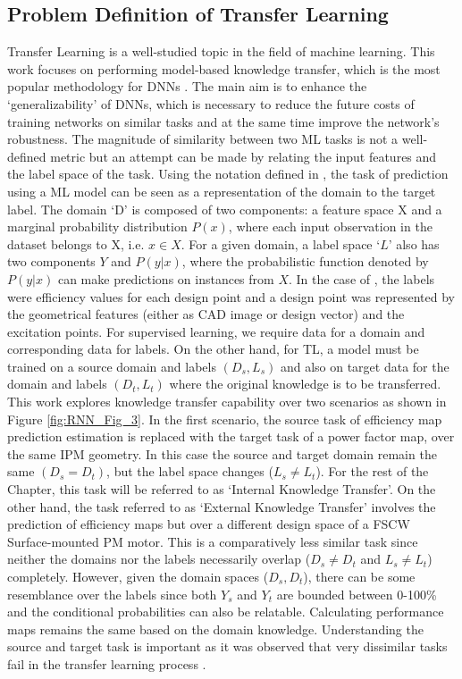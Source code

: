 \subsection{Problem Definition of Transfer Learning} \label{RNN:7.2prob_def_TL}

Transfer Learning is a well-studied topic in the field of machine learning. This work focuses on performing model-based knowledge transfer, which is the most popular methodology for DNNs \parencite{pan2009survey}. The main aim is to enhance the ‘generalizability’ of DNNs, which is necessary to reduce the future costs of training networks on similar tasks and at the same time improve the network’s robustness. The magnitude of similarity between two ML tasks is not a well-defined metric but an attempt can be made by relating the input features and the label space of the task. Using the notation defined in \cite{pan2009survey}, the task of prediction using a ML model can be seen as a representation of the domain to the target label. The domain ‘D’ is composed of two components: a feature space X and a marginal probability distribution $P(x)$, where each input observation in the dataset belongs to X, i.e. $x \in X$. For a given domain, a label space ‘$L$’ also has two components $Y$ and $P(y | x)$, where the probabilistic function denoted by $P(y | x)$ can make predictions on instances from $X$. In the case of \parencite{khan2020efficiency}, the labels were efficiency values for each design point and a design point was represented by the geometrical features (either as CAD image or design vector) and the excitation points. For supervised learning, we require data for a domain and corresponding data for labels. On the other hand, for TL, a model must be trained on a source domain and labels $(D_s,L_s)$ and also on target data for the domain and labels $(D_t,L_t)$ where the original knowledge is to be transferred. 
This work explores knowledge transfer capability over two scenarios as shown in Figure \ref{fig:RNN_Fig_3}. In the first scenario, the source task of efficiency map prediction estimation is replaced with the target task of a power factor map, over the same IPM geometry. In this case the source and target domain remain the same $(D_s=D_t)$, but the label space changes ($L_s \neq L_t$). For the rest of the Chapter, this task will be referred to as ‘Internal Knowledge Transfer’. 
On the other hand, the task referred to as ‘External Knowledge Transfer’ involves the prediction of efficiency maps but over a different design space of a FSCW Surface-mounted PM motor. This is a comparatively less similar task since neither the domains nor the labels necessarily overlap ($D_s \neq D_t$ and $L_s \neq L_t$) completely. However, given the domain spaces ($D_s,D_t$), there can be some resemblance over the labels since both $Y_s$ and $Y_t$ are bounded between 0-100\% and the conditional probabilities can also be relatable. Calculating performance maps remains the same based on the domain knowledge. Understanding the source and target task is important as it was observed that very dissimilar tasks fail in the transfer learning process \parencite{mou2016transferable}.

